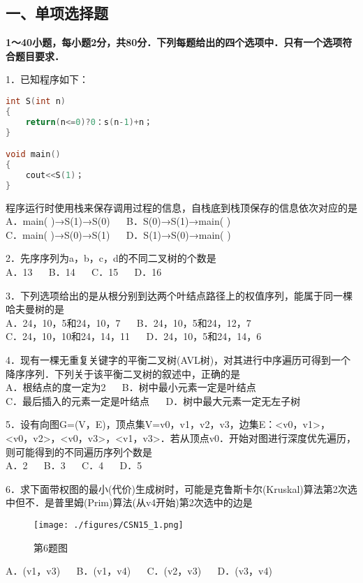 
\subsection{一、单项选择题}
\textbf{1～40小题，每小题2分，共80分．下列每题给出的四个选项中．只有一个选项符合题目要求．}

1．已知程序如下： \\
\begin{lstlisting}[language=cpp]
int S(int n)
{
    return(n<=0)?0：s(n-1)+n；
}

void main()
{ 
    cout<<S(1)；
}
\end{lstlisting}
程序运行时使用栈来保存调用过程的信息，自栈底到栈顶保存的信息依次对应的是 \\
A．main( )→S(1)→S(0) $\quad$ B．S(0)→S(1)→main( ) \\
C．main( )→S(0)→S(1) $\quad$ D．S(1)→S(0)→main( )

2．先序序列为a，b，c，d的不同二叉树的个数是 \\
A．13 $\quad$ B．14 $\quad$ C．15 $\quad$ D．16

3．下列选项给出的是从根分别到达两个叶结点路径上的权值序列，能属于同一棵哈夫曼树的是 \\
A．24，10，5和24，10，7 $\quad$ B．24，10，5和24，12，7 \\
C．24，10，10和24，14，11 $\quad$ D．24，10，5和24，14，6

4．现有一棵无重复关键字的平衡二叉树(AVL树)，对其进行中序遍历可得到一个降序序列．下列关于该平衡二叉树的叙述中，正确的是 \\
A．根结点的度一定为2 $\quad$ B．树中最小元素一定是叶结点 \\
C．最后插入的元素一定是叶结点 $\quad$ D．树中最大元素一定无左子树

5．设有向图G=(V，E)，顶点集V={v0，v1，v2，v3}，边集E：{<v0，v1>，<v0，v2>，<v0，v3>，<v1，v3>}．若从顶点v0．开始对图进行深度优先遍历，则可能得到的不同遍历序列个数是 \\
A．2 $\quad$ B．3 $\quad$ C．4 $\quad$ D．5

6．求下面带权图的最小(代价)生成树时，可能是克鲁斯卡尔(Kruskal)算法第2次选中但不．是普里姆(Prim)算法(从v4开始)第2次选中的边是
\begin{figure}[ht]
\centering
\texttt{[image: ./figures/CSN15\_1.png]}
\caption{第6题图} \label{CSN15_fig1}
\end{figure}
A．(v1，v3) $\quad$ B．(v1，v4) $\quad$ C．(v2，v3) $\quad$ D．(v3，v4)

